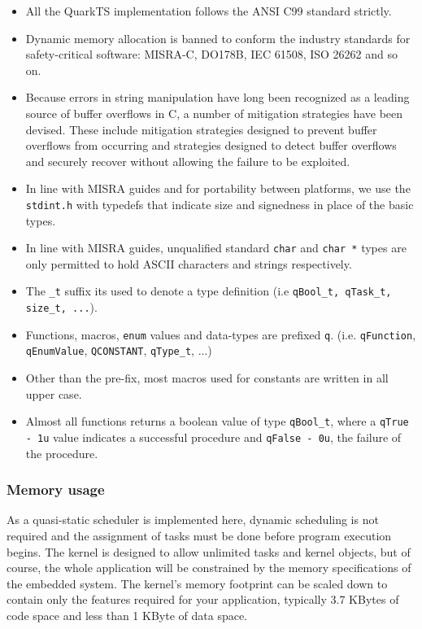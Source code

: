 \begin{itemize}
    \item All the QuarkTS implementation follows the ANSI C99 standard strictly.
    \item Dynamic memory allocation is banned to conform the industry standards for safety-critical software: MISRA-C, DO178B, IEC 61508, ISO 26262 and so on.
    \item Because errors in string manipulation have long been recognized as a leading source of buffer overflows in C, a number of mitigation strategies have been devised. These include mitigation strategies designed to prevent buffer overflows from occurring and strategies designed to detect buffer overflows and securely recover without allowing the failure to be exploited.
    \item In line with MISRA guides and for portability between platforms, we use the \lstinline{stdint.h} with typedefs that indicate size and signedness in place of the basic types.
    \item In line with MISRA guides, unqualified standard \lstinline{char} and \lstinline{char *} types are only permitted to hold ASCII characters and strings respectively.    
    \item The \lstinline{_t} suffix its used to denote a type definition (i.e \lstinline{qBool_t, qTask_t, size_t, ...}).   
    \item Functions, macros, \lstinline{enum} values and data-types are prefixed \lstinline{q}. (i.e. \lstinline{qFunction}, \lstinline{qEnumValue}, \lstinline{QCONSTANT}, \lstinline{qType_t}, ...)
    \item Other than the pre-fix, most macros used for constants are written in all upper case.
    \item Almost all functions returns a boolean value of type \lstinline{qBool_t}, where a \lstinline{qTrue - 1u}  value indicates a successful procedure and \lstinline{qFalse - 0u}, the failure of the procedure.
\end{itemize}

\subsubsection{Memory usage}
As a quasi-static scheduler is implemented here, dynamic scheduling is not required and the assignment of tasks must be done before program execution begins.
The kernel is designed to allow unlimited tasks and kernel objects, but of course, the whole application will be constrained by the memory specifications of the embedded system. 
The kernel's memory footprint can be scaled down to contain only the features required for your application, typically 3.7 KBytes of code space and less than 1 KByte of data space. 

